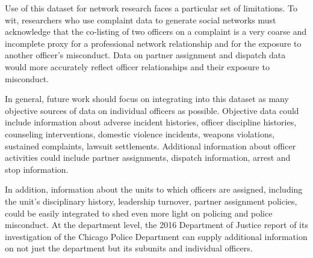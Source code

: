 Use of this dataset for network research faces a particular set of limitations.
To wit, researchers who use complaint data to generate social networks must
acknowledge that the co-listing of two officers on a complaint is a very coarse
and incomplete proxy for a professional network relationship and for the
exposure to another officer’s misconduct. Data on partner assignment and
dispatch data would more accurately reflect officer relationships and their
exposure to misconduct. 

In general, future work should focus on integrating into this dataset as many
objective sources of data on individual officers as possible. Objective data
could include information about adverse incident histories, officer discipline
histories, counseling interventions, domestic violence incidents, weapons
violations, sustained complaints, lawsuit settlements. Additional information
about officer activities could include partner assignments, dispatch
information, arrest and stop information. 

In addition, information about the units to which officers are assigned,
including the unit’s disciplinary history, leadership turnover, partner
assignment policies, could be easily integrated to shed even more light on
policing and police misconduct. At the department level, the 2016 Department of
Justice report of its investigation of the Chicago Police Department can supply
additional information on not just the department but its subunits and
individual officers.
